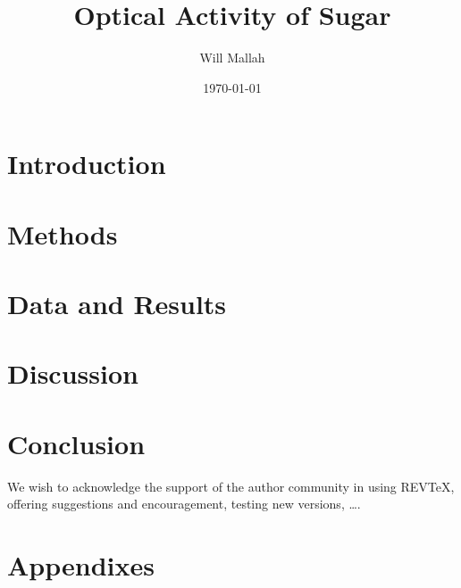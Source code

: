 \documentclass[%
 reprint,
 amsmath,amssymb,
 aps,
]{revtex4-2}
\begin{document}

\title{Optical Activity of Sugar}

\author{Will Mallah}


\date{\today}

\begin{abstract}
    
\end{abstract}

\maketitle

\section{Introduction}


\newpage
\section{Methods}


\newpage
\section{Data and Results}


\newpage
\section{Discussion}


\newpage
\section{Conclusion}


\newpage
\begin{acknowledgments}
    We wish to acknowledge the support of the author community in using
    REV\TeX{}, offering suggestions and encouragement, testing new versions,
    \dots.
    \end{acknowledgments}
    
    \appendix
    
    \section{Appendixes}
    
\end{document}
